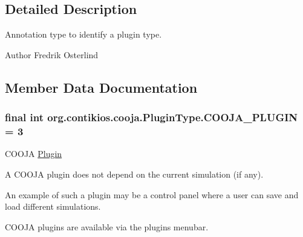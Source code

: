 \subsection{Detailed Description}
Annotation type to identify a plugin type.

\begin{DoxyAuthor}{Author}
Fredrik Osterlind 
\end{DoxyAuthor}


\subsection{Member Data Documentation}
\hypertarget{interfaceorg_1_1contikios_1_1cooja_1_1PluginType_ab27aecee60e220de3c427952226e45f8}{
\subsubsection[{C\-O\-O\-J\-A\-\_\-\-P\-L\-U\-G\-I\-N}]{\setlength{\rightskip}{0pt plus 5cm}final int org.\-contikios.\-cooja.\-Plugin\-Type.\-C\-O\-O\-J\-A\-\_\-\-P\-L\-U\-G\-I\-N = 3\hspace{0.3cm}{\ttfamily [static]}}}\label{interfaceorg_1_1contikios_1_1cooja_1_1PluginType_ab27aecee60e220de3c427952226e45f8}
C\-O\-O\-J\-A \hyperlink{interfaceorg_1_1contikios_1_1cooja_1_1Plugin}{Plugin}

A C\-O\-O\-J\-A plugin does not depend on the current simulation (if any).

An example of such a plugin may be a control panel where a user can save and load different simulations.

C\-O\-O\-J\-A plugins are available via the plugins menubar.

